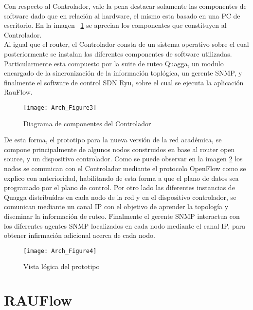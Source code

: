 \newpage
Con respecto al Controlador, vale la pena destacar solamente las componentes de software dado que en relaci\'on al hardware, el mismo esta basado en una PC de escritorio. En la imagen ~\ref{fig:OpenSourceRArch3} se aprecian los componentes que constituyen al Controlador.\\

Al igual que el router, el Controlador consta de un sistema operativo sobre el cual posteriormente se instalan las diferentes componentes de software utilizadas. Particularmente esta compuesto por la suite de ruteo Quagga, un modulo encargado de la sincronizaci\'on de la informaci\'on topl\'ogica, un gerente SNMP, y finalmente el software de control SDN Ryu, sobre el cual se ejecuta la aplicaci\'on RauFlow.

\begin{figure}[htbp!] 
\centering    
\texttt{[image: Arch\_Figure3]}
\caption[OpenSourceRArch3]{Diagrama de componentes del Controlador}
\label{fig:OpenSourceRArch3}
\end{figure}

De esta forma, el prototipo para la nueva versi\'on de la red acad\'emica, se compone principalmente de algunos nodos construidos en base al router open source, y un dispositivo controlador. Como se puede observar en la imagen \ref{fig:OpenSourceRArch4} los nodos se comunican con el Controlador mediante el protocolo OpenFlow como se explico con anterioridad, habilitando de esta forma a que el plano de datos sea programado por el plano de control. Por otro lado las diferentes instancias de Quagga distribu\'idas en cada nodo de la red y en el dispositivo controlador, se comunican mediante un canal IP con el objetivo de aprender la topolog\'ia y diseminar la informaci\'on de ruteo. Finalmente el gerente SNMP interactua con los diferentes agentes SNMP localizados en cada nodo mediante el canal IP, para obtener infirmaci\'on adicional acerca de cada nodo. 

\begin{figure}[htbp!] 
\centering    
\texttt{[image: Arch\_Figure4]}
\caption[OpenSourceRArch4]{Vista l\'ogica del prototipo}
\label{fig:OpenSourceRArch4}
\end{figure}

\newpage
\section[RAUFlow]{RAUFlow}

